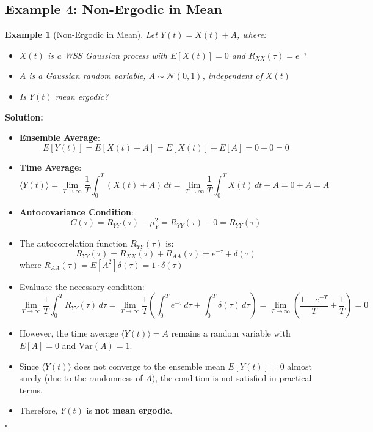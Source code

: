 \documentclass[12pt]{article}
\newtheorem{example}{Example}
\newenvironment{solution}{\noindent\textbf{Solution:}}{\hfill$\square$}
\begin{document}
\subsection{Example 4: Non-Ergodic in Mean}
\begin{example}[Non-Ergodic in Mean]
Let \( Y(t) = X(t) + A \), where:
\begin{itemize}
    \item \( X(t) \) is a WSS Gaussian process with \( E[X(t)] = 0 \) and \( R_{XX}(\tau) = e^{-\tau} \)
    \item \( A \) is a Gaussian random variable, \( A \sim \mathcal{N}(0,1) \), independent of \( X(t) \)
\end{itemize}
\begin{itemize}
    \item Is \( Y(t) \) mean ergodic?
\end{itemize}
\end{example}
\begin{solution}
\begin{itemize}
    \item \textbf{Ensemble Average}:
    \[
    E[Y(t)] = E[X(t) + A] = E[X(t)] + E[A] = 0 + 0 = 0
    \]
    \item \textbf{Time Average}:
    \[
    \langle Y(t) \rangle = \lim_{T \to \infty} \frac{1}{T} \int_{0}^{T} (X(t) + A) \, dt = \lim_{T \to \infty} \frac{1}{T} \int_{0}^{T} X(t) \, dt + A = 0 + A = A
    \]
    \item \textbf{Autocovariance Condition}:
    \[
    C(\tau) = R_{YY}(\tau) - \mu_Y^2 = R_{YY}(\tau) - 0 = R_{YY}(\tau)
    \]
    \item The autocorrelation function \( R_{YY}(\tau) \) is:
    \[
    R_{YY}(\tau) = R_{XX}(\tau) + R_{AA}(\tau) = e^{-\tau} + \delta(\tau)
    \]
    where \( R_{AA}(\tau) = E[A^2] \delta(\tau) = 1 \cdot \delta(\tau) \)
    \item Evaluate the necessary condition:
    \[
    \lim_{T \to \infty} \frac{1}{T} \int_{0}^{T} R_{YY}(\tau) \, d\tau = \lim_{T \to \infty} \frac{1}{T} \left( \int_{0}^{T} e^{-\tau} \, d\tau + \int_{0}^{T} \delta(\tau) \, d\tau \right) = \lim_{T \to \infty} \left( \frac{1 - e^{-T}}{T} + \frac{1}{T} \right) = 0
    \]
    \item However, the time average \( \langle Y(t) \rangle = A \) remains a random variable with \( E[A] = 0 \) and \( \text{Var}(A) = 1 \).
    \item Since \( \langle Y(t) \rangle \) does not converge to the ensemble mean \( E[Y(t)] = 0 \) almost surely (due to the randomness of \( A \)), the condition is not satisfied in practical terms.
    \item Therefore, \( Y(t) \) is \textbf{not mean ergodic}.
\end{itemize}
\end{solution}
\end{document}
